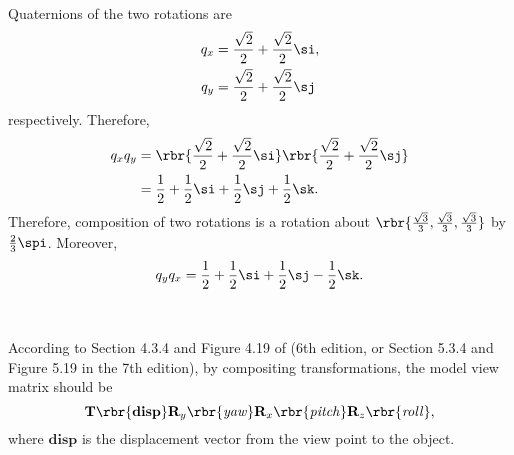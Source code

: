 \documentclass[english, nochinese]{../textmpls/pkupaper}
\begin{document}
\begin{thmquestion}
\
\begin{thmanswer}
Quaternions of the two rotations are
\begin{align}
q_x &= \frac{\sqrt{2}}{2} + \frac{\sqrt{2}}{2} \si, \\
q_y &= \frac{\sqrt{2}}{2} + \frac{\sqrt{2}}{2} \sj
\end{align}
respectively. Therefore,
\begin{equation}
\begin{split}
q_x q_y &= \rbr{ \frac{\sqrt{2}}{2} + \frac{\sqrt{2}}{2} \si } \rbr{ \frac{\sqrt{2}}{2} + \frac{\sqrt{2}}{2} \sj } \\
&= \frac{1}{2} + \frac{1}{2} \si + \frac{1}{2} \sj + \frac{1}{2} \sk.
\end{split}
\end{equation}
Therefore, composition of two rotations is a rotation about $ \rbr{ \frac{\sqrt{3}}{3}, \frac{\sqrt{3}}{3}, \frac{\sqrt{3}}{3} } $ by $ \frac{2}{3} \spi $. Moreover,
\begin{equation}
q_y q_x = \frac{1}{2} + \frac{1}{2} \si + \frac{1}{2} \sj - \frac{1}{2} \sk.
\end{equation}
\end{thmanswer}
\end{thmquestion}

\begin{thmquestion}
\
\begin{thmanswer}
According to Section 4.3.4 and Figure 4.19 of (6th edition, or Section 5.3.4 and Figure 5.19 in the 7th edition), by compositing transformations, the model view matrix should be
\begin{equation}
\mathbf{T} \rbr{\mathbf{disp}} \mathbf{R}_y \rbr{\mathit{yaw}} \mathbf{R}_x \rbr{\mathit{pitch}} \mathbf{R}_z \rbr{\mathit{roll}},
\end{equation}
where $\mathbf{disp}$ is the displacement vector from the view point to the object.
\end{thmanswer}
\end{thmquestion}
\end{document}
